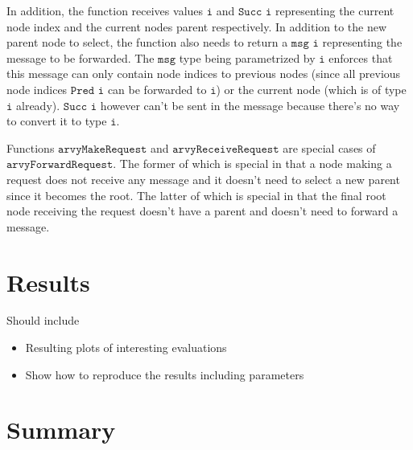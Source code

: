 \documentclass[a4paper, oneside]{discothesis}
\begin{document}
In addition, the function receives values $\texttt{i}$ and $\texttt{Succ i}$ representing the current node index and the current nodes parent respectively. In addition to the new parent node to select, the function also needs to return a $\texttt{msg i}$ representing the message to be forwarded. The $\texttt{msg}$ type being parametrized by $\texttt{i}$ enforces that this message can only contain node indices to previous nodes (since all previous node indices $\texttt{Pred i}$ can be forwarded to $\texttt{i}$) or the current node (which is of type $\texttt{i}$ already). $\texttt{Succ i}$ however can't be sent in the message because there's no way to convert it to type $\texttt{i}$.

Functions $\texttt{arvyMakeRequest}$ and $\texttt{arvyReceiveRequest}$ are special cases of $\texttt{arvyForwardRequest}$. The former of which is special in that a node making a request does not receive any message and it doesn't need to select a new parent since it becomes the root. The latter of which is special in that the final root node receiving the request doesn't have a parent and doesn't need to forward a message.

\chapter{Results}

Should include
\begin{itemize}
\item Resulting plots of interesting evaluations
\item Show how to reproduce the results including parameters
\end{itemize}

\chapter{Summary}





\end{document}
